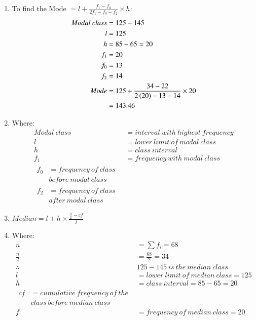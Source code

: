 \renewcommand{\theequation}{\theenumi}
\begin{enumerate}

\item To find the Mode $= l + \frac{f_1 - f_0}{2f_1 - f_0 - f_2} \times h$:
\begin{align}
Modal\ class &= 125 - 145\\ 
l &= 125\\
h &= 85 - 65 = 20\\
f_1 &= 20\\
f_0 &= 13\\
f_2 &= 14\\
Mode &= 125 + \frac{34-22}{2\left(20\right) - 13 - 14} \times 20\\
&= 143.46
\end{align}

\item Where:
\begin{align*}
Modal\ class &= interval\ with\ highest\ frequency\\
l &= lower\ limit\ of\ modal\ class\\
h &= class\ interval\\
f_1 &= frequency\ with\ modal\ class\\
\begin{split}
f_0 &= frequency\ of\ class\ \\ &before\ modal\ class
\end{split}\\
\begin{split}
f_2 &= frequency\ of\ class\ \\ &after\ modal\ class
\end{split}
\end{align*}

\item $Median = l + h \times \frac{\frac{n}{2} - cf}{f}$

\item Where:
\begin{align*}
n &= \sum f_i = 68 \\
\frac{n}{2} &= \frac{68}{2} = 34\\
\therefore &125-145\ is\ the\ median\ class\\
l &= lower\ limit\ of\ median\ class = 125\\
h &= class\ interval = 85 - 65 = 20 \\
\begin{split}
cf &= cumulative\ frequency\ of\ the \\
&class\ before\ median\ class
\end{split}\\
f &= frequency\ of\ median\ class = 20
\end{align*}


\end{enumerate}
